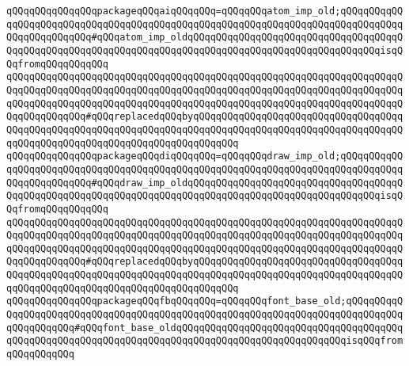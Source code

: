\verb|qQQqqQQqqQQqqQQqpackageqQQqaiqQQqqQQq=qQQqqQQqatom_imp_old;qQQqqQQqqQQqqQQqqQQqqQQqqQQqqQQqqQQqqQQqqQQqqQQqqQQqqQQqqQQqqQQqqQQqqQQqqQQqqQQqqQQqqQQqqQQqqQQq#qQQqatom_imp_oldqQQqqQQqqQQqqQQqqQQqqQQqqQQqqQQqqQQqqQQqqQQqqQQqqQQqqQQqqQQqqQQqqQQqqQQqqQQqqQQqqQQqqQQqqQQqqQQqqQQqqQQqisqQQqfromqQQqqQQqqQQq|\newline
\verb|qQQqqQQqqQQqqQQqqQQqqQQqqQQqqQQqqQQqqQQqqQQqqQQqqQQqqQQqqQQqqQQqqQQqqQQqqQQqqQQqqQQqqQQqqQQqqQQqqQQqqQQqqQQqqQQqqQQqqQQqqQQqqQQqqQQqqQQqqQQqqQQqqQQqqQQqqQQqqQQqqQQqqQQqqQQqqQQqqQQqqQQqqQQqqQQqqQQqqQQqqQQqqQQqqQQqqQQqqQQqqQQq#qQQqreplacedqQQqbyqQQqqQQqqQQqqQQqqQQqqQQqqQQqqQQqqQQqqQQqqQQqqQQqqQQqqQQqqQQqqQQqqQQqqQQqqQQqqQQqqQQqqQQqqQQqqQQqqQQqqQQqqQQqqQQqqQQqqQQqqQQqqQQqqQQqqQQqqQQqqQQqqQQq|\newline
\newline
\verb|qQQqqQQqqQQqqQQqpackageqQQqdiqQQqqQQq=qQQqqQQqdraw_imp_old;qQQqqQQqqQQqqQQqqQQqqQQqqQQqqQQqqQQqqQQqqQQqqQQqqQQqqQQqqQQqqQQqqQQqqQQqqQQqqQQqqQQqqQQqqQQqqQQq#qQQqdraw_imp_oldqQQqqQQqqQQqqQQqqQQqqQQqqQQqqQQqqQQqqQQqqQQqqQQqqQQqqQQqqQQqqQQqqQQqqQQqqQQqqQQqqQQqqQQqqQQqqQQqqQQqqQQqisqQQqfromqQQqqQQqqQQq|\newline
\verb|qQQqqQQqqQQqqQQqqQQqqQQqqQQqqQQqqQQqqQQqqQQqqQQqqQQqqQQqqQQqqQQqqQQqqQQqqQQqqQQqqQQqqQQqqQQqqQQqqQQqqQQqqQQqqQQqqQQqqQQqqQQqqQQqqQQqqQQqqQQqqQQqqQQqqQQqqQQqqQQqqQQqqQQqqQQqqQQqqQQqqQQqqQQqqQQqqQQqqQQqqQQqqQQqqQQqqQQqqQQqqQQq#qQQqreplacedqQQqbyqQQqqQQqqQQqqQQqqQQqqQQqqQQqqQQqqQQqqQQqqQQqqQQqqQQqqQQqqQQqqQQqqQQqqQQqqQQqqQQqqQQqqQQqqQQqqQQqqQQqqQQqqQQqqQQqqQQqqQQqqQQqqQQqqQQqqQQqqQQqqQQqqQQq|\newline
\newline
\verb|qQQqqQQqqQQqqQQqpackageqQQqfbqQQqqQQq=qQQqqQQqfont_base_old;qQQqqQQqqQQqqQQqqQQqqQQqqQQqqQQqqQQqqQQqqQQqqQQqqQQqqQQqqQQqqQQqqQQqqQQqqQQqqQQqqQQqqQQqqQQq#qQQqfont_base_oldqQQqqQQqqQQqqQQqqQQqqQQqqQQqqQQqqQQqqQQqqQQqqQQqqQQqqQQqqQQqqQQqqQQqqQQqqQQqqQQqqQQqqQQqqQQqqQQqqQQqisqQQqfromqQQqqQQqqQQq|\newline
